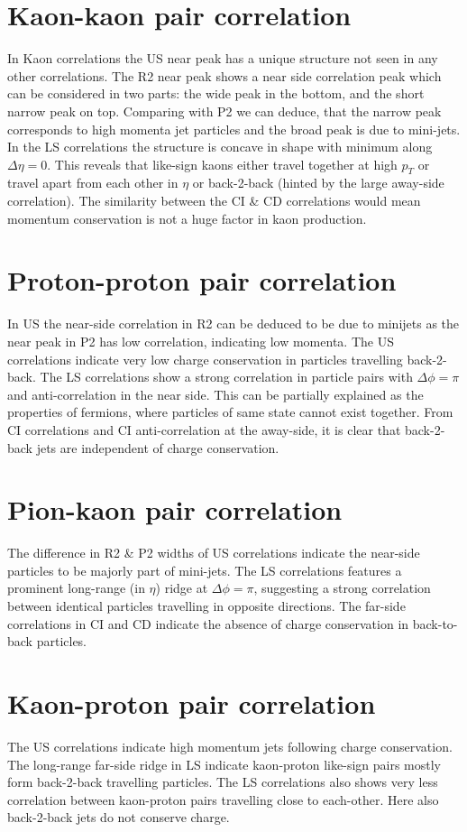 \documentclass[12pt,a4paper,twoside]{report}
\begin{document}
\section{Kaon-kaon pair correlation}
In Kaon correlations the US near peak has a unique structure not seen in any other correlations. The R2 near peak shows a near side correlation peak which can be considered in two parts: the wide peak in the bottom, and the short narrow peak on top. Comparing with P2 we can deduce, that the narrow peak corresponds to high momenta jet particles and the broad peak is due to mini-jets. In the LS correlations the structure is concave in shape with minimum along $\Delta\eta=0$. This reveals that like-sign kaons either travel together at high $p_T$ or travel apart from each other in $\eta$ or back-2-back (hinted by the large away-side correlation). The similarity between the CI \& CD correlations would mean momentum conservation is not a huge factor in kaon production.
\section{Proton-proton pair correlation}
In US the near-side correlation in R2 can be deduced to be due to minijets as the near peak in P2 has low correlation, indicating low momenta. The US correlations indicate very low charge conservation in particles travelling back-2-back. The LS correlations show a strong correlation in particle pairs with $\Delta\phi=\pi$ and anti-correlation in the near side. This can be partially explained as the properties of fermions, where particles of same state cannot exist together. From CI correlations and CI anti-correlation at the away-side, it is clear that back-2-back jets are independent of charge conservation. 
\section{Pion-kaon pair correlation}
The difference in R2 \& P2 widths of US correlations indicate the near-side particles to be majorly part of mini-jets. The LS correlations features a prominent long-range (in $\eta$) ridge at $\Delta\phi=\pi$, suggesting a strong correlation between identical particles travelling in opposite directions. The far-side correlations in CI and CD indicate the absence of charge conservation in back-to-back particles.
\section{Kaon-proton pair correlation}
The US correlations indicate high momentum jets following charge conservation. The long-range far-side ridge in LS indicate kaon-proton like-sign pairs mostly form back-2-back travelling particles. The LS correlations also shows very less correlation between kaon-proton pairs travelling close to each-other. Here also back-2-back jets do not conserve charge.
\end{document}
